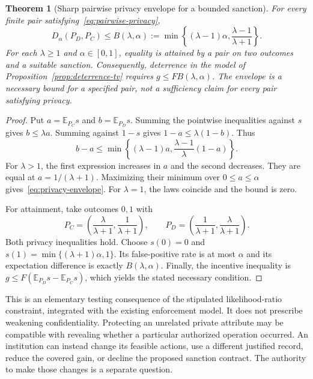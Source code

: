 \documentclass[11pt,letterpaper]{article}
\theoremstyle{plain}
\newtheorem{theorem}[proposition]{Theorem}
\theoremstyle{definition}
\theoremstyle{remark}
\newcommand{\E}{\mathbb E}
\begin{document}
\begin{theorem}[Sharp pairwise privacy envelope for a bounded sanction]\label{thm:privacy-envelope}
For every finite pair satisfying~\eqref{eq:pairwise-privacy},
\begin{equation}\label{eq:privacy-envelope}
D_\alpha(P_D,P_C)\le
 B(\lambda,\alpha):=
 \min\left\{(\lambda-1)\alpha,\frac{\lambda-1}{\lambda+1}\right\}.
\end{equation}
For each $\lambda\ge1$ and $\alpha\in[0,1]$, equality is attained by a pair on two outcomes and a suitable sanction. Consequently, deterrence in the model of Proposition~\ref{prop:deterrence-tv} requires $g\le F B(\lambda,\alpha)$. The envelope is a necessary bound for a specified pair, not a sufficiency claim for every pair satisfying privacy.
\end{theorem}
\begin{proof}
Put $a=\E_{P_C}s$ and $b=\E_{P_D}s$. Summing the pointwise inequalities against $s$ gives $b\le\lambda a$. Summing against $1-s$ gives $1-a\le\lambda(1-b)$. Thus
\[
b-a\le\min\left\{(\lambda-1)a,
                   \frac{\lambda-1}{\lambda}(1-a)\right\}.
\]
For $\lambda>1$, the first expression increases in $a$ and the second decreases. They are equal at $a=1/(\lambda+1)$. Maximizing their minimum over $0\le a\le\alpha$ gives~\eqref{eq:privacy-envelope}. For $\lambda=1$, the laws coincide and the bound is zero.

For attainment, take outcomes $0,1$ with
\[
P_C=\left(\frac{\lambda}{\lambda+1},\frac1{\lambda+1}\right),
\qquad
P_D=\left(\frac1{\lambda+1},\frac{\lambda}{\lambda+1}\right).
\]
Both privacy inequalities hold. Choose $s(0)=0$ and
$s(1)=\min\{(\lambda+1)\alpha,1\}$. Its false-positive rate is at most $\alpha$ and its expectation difference is exactly $B(\lambda,\alpha)$. Finally, the incentive inequality is $g\le F(\E_{P_D}s-\E_{P_C}s)$, which yields the stated necessary condition.
\end{proof}

This is an elementary testing consequence of the stipulated likelihood-ratio constraint, integrated with the existing enforcement model. It does not prescribe weakening confidentiality. Protecting an unrelated private attribute may be compatible with revealing whether a particular authorized operation occurred. An institution can instead change its feasible actions, use a different justified record, reduce the covered gain, or decline the proposed sanction contract. The authority to make those changes is a separate question.
\end{document}
